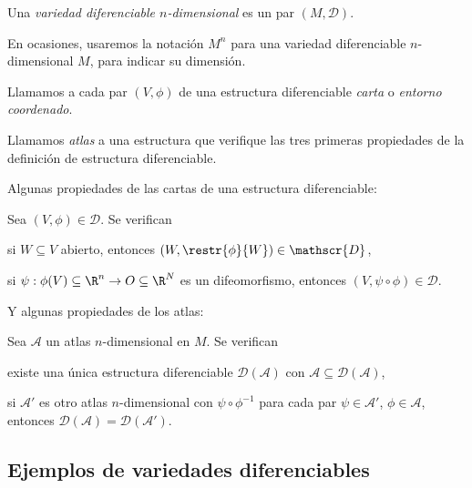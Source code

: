 \begin{ndef}
  Una \emph{variedad diferenciable $n$-dimensional} es un par $(M, \mathscr{D})$.
\end{ndef}
\begin{notacion}
  En ocasiones, usaremos la notación $M^{n}$ para una variedad diferenciable
  $n$-dimensional $M$, para indicar su dimensión.
\end{notacion}

Llamamos a cada par $(V,\phi)$ de una estructura diferenciable \emph{carta} o
\emph{entorno coordenado}.

\begin{ndef}[Atlas]
  Llamamos \emph{atlas} a una estructura que verifique las tres primeras
  propiedades de la definición de estructura diferenciable.
\end{ndef}

Algunas propiedades de las cartas de una estructura diferenciable:
\begin{nprop} \label{prop:cartas}
  Sea $(V,\phi)\in\mathscr{D}$. Se verifican
  \begin{nlist}
  \item \label{item:rest-cartas}
    si $W\subseteq V$ abierto, entonces
$(W,\restr{\phi}{W})\in\mathscr{D}$,
  \item 
    si $\psi: \phi(V) \subseteq \R^{n} \to O\subseteq\R^{N}$ es un
    difeomorfismo, entonces $(V, \psi\circ\phi)\in\mathscr{D}$.
  \end{nlist}
\end{nprop}

Y algunas propiedades de los atlas:
\begin{nprop} \label{prop:unicidad-atlas}
  Sea $\mathscr{A}$ un atlas $n$-dimensional en $M$. Se verifican
  \begin{nlist}
  \item
    existe una única estructura diferenciable $\mathscr{D}(\mathscr{A})$ con
    $\mathscr{A}\subseteq \mathscr{D}(\mathscr{A})$,
  \item
    si $\mathscr{A}'$ es otro atlas $n$-dimensional con $\psi\circ\phi^{-1}$
    para cada par $\psi\in \mathscr{A}'$, $\phi\in \mathscr{A}$, entonces
    $\mathscr{D}(\mathscr{A}) = \mathscr{D}(\mathscr{A}')$.
  \end{nlist}
\end{nprop}

\subsection{Ejemplos de variedades diferenciables}

